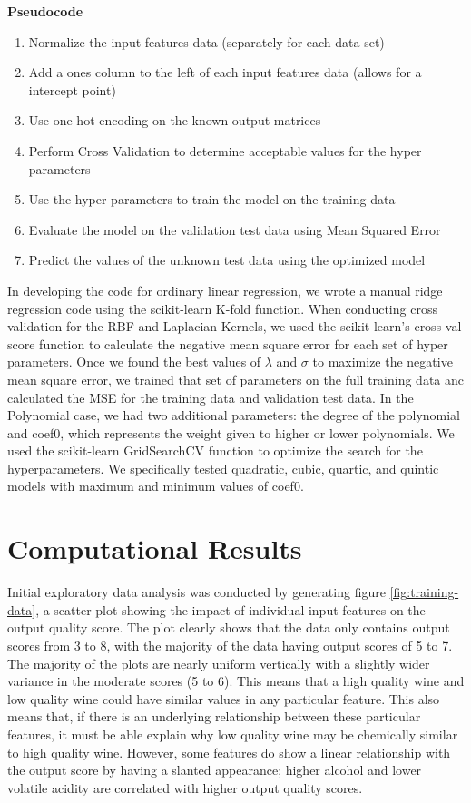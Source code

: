 \documentclass[11pt]{amsart}
\begin{document}
\textbf{Pseudocode}
\begin{enumerate}
   \item Normalize the input features data (separately for each data set)
   \item Add a ones column to the left of each input features data (allows for a intercept point)
   \item Use one-hot encoding on the known output matrices
   \item Perform Cross Validation to determine acceptable values for the hyper parameters
   \item Use the hyper parameters to train the model on the training data
   \item Evaluate the model on the validation test data using Mean Squared Error 
   \item Predict the values of the unknown test data using the optimized model
\end{enumerate}

In developing the code for ordinary linear regression, we wrote a manual ridge regression code using the scikit-learn K-fold function. 
When conducting cross validation for the RBF and Laplacian Kernels, we used the scikit-learn's cross val score function to calculate the 
negative mean square error for each set of hyper parameters. Once we found the best values of $\lambda$ and $\sigma$ to maximize the negative mean square error, 
we trained that set of parameters on the full training data anc calculated the MSE for the training data and validation test data. In the Polynomial case, 
we had two additional parameters: the degree of the polynomial and coef0, which represents the weight given to higher or lower polynomials. We used the scikit-learn GridSearchCV 
function to optimize the search for the hyperparameters. We specifically tested quadratic, cubic, quartic, and quintic models with maximum and minimum values of coef0.

\section{Computational Results}\label{sec:results}

Initial exploratory data analysis was conducted by generating figure \ref{fig:training-data}, a scatter plot showing the impact 
of individual input features on the output quality score. The plot clearly shows that the data only contains output scores from 3 to 8, 
with the majority of the data having output scores of 5 to 7. The majority of the plots are nearly uniform vertically with 
a slightly wider variance in the moderate scores (5 to 6). This means that a high quality wine and low quality wine could 
have similar values in any particular feature. This also means that, if there is an underlying relationship between these 
particular features, it must be able explain why low quality wine may be chemically similar to high quality wine. However, some 
features do show a linear relationship with the output score by having a slanted appearance; higher alcohol and lower volatile acidity 
are correlated with higher output quality scores.
\end{document}
